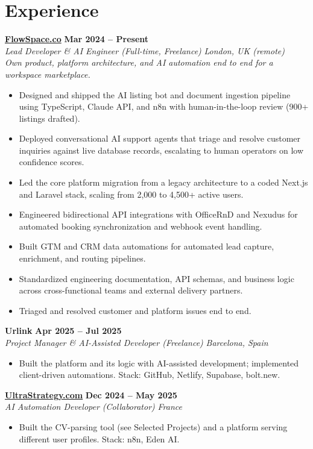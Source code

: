 \documentclass[a4paper,10pt]{article}
\newcommand{\role}[4]{%
 \textbf{#1} \hfill \textbf{#2}\\[1pt]%
 \textit{#3} \hfill \textit{#4}\\[2pt]%
}
\begin{document}
\section{Experience}

\role{\href{https://flowspace.co}{FlowSpace.co}}{Mar 2024 -- Present}{Lead Developer \& AI Engineer (Full-time, Freelance)}{London, UK (remote)}
\textit{Own product, platform architecture, and AI automation end to end for a workspace marketplace.}
\begin{itemize}
 \item Designed and shipped the AI listing bot and document ingestion pipeline using TypeScript, Claude API, and n8n with human-in-the-loop review (900+ listings drafted).
 \item Deployed conversational AI support agents that triage and resolve customer inquiries against live database records, escalating to human operators on low confidence scores.
 \item Led the core platform migration from a legacy architecture to a coded Next.js and Laravel stack, scaling from 2,000 to 4,500+ active users.
 \item Engineered bidirectional API integrations with OfficeRnD and Nexudus for automated booking synchronization and webhook event handling.
 \item Built GTM and CRM data automations for automated lead capture, enrichment, and routing pipelines.
 \item Standardized engineering documentation, API schemas, and business logic across cross-functional teams and external delivery partners.
 \item Triaged and resolved customer and platform issues end to end.
\end{itemize}

\role{Urlink}{Apr 2025 -- Jul 2025}{Project Manager \& AI-Assisted Developer (Freelance)}{Barcelona, Spain}
\begin{itemize}
 \item Built the platform and its logic with AI-assisted development; implemented client-driven automations. Stack: GitHub, Netlify, Supabase, bolt.new.
\end{itemize}

\pagebreak
\role{\href{https://ultrastrategy.com}{UltraStrategy.com}}{Dec 2024 -- May 2025}{AI Automation Developer (Collaborator)}{France}
\begin{itemize}
 \item Built the CV-parsing tool (see Selected Projects) and a platform serving different user profiles. Stack: n8n, Eden AI.
\end{itemize}
\end{document}
